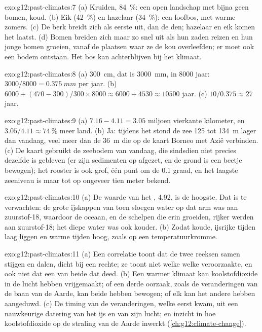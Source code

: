 \begin{solution}{exo:g12:past-climates:7}
(a) Kruiden, \qty{84}{\percent}: een open landschap met bijna geen bomen, koud.
(b) Eik (\qty{42}{\percent}) en hazelaar (\qty{34}{\percent}): een loofbos,
met warme zomers. (c) De berk breidt zich als eerste uit, dan de den; hazelaar en eik
komen het laatst. (d) Bomen breiden zich maar zo snel uit als hun zaden reizen en hun
jonge bomen groeien, vanaf de plaatsen waar ze de kou overleefden; er moet
ook een bodem ontstaan. Het bos kan achterblijven bij het klimaat.
\end{solution}

\begin{solution}{exo:g12:past-climates:8}
(a) \qty{300}{cm}, dat is \qty{3000}{mm}, in \num{8000} jaar: $3000/8000 =
\qty{0.375}{mm}$ per jaar. (b) $\num{6000} + (470 - 300)/300 \times \num{8000}
\approx \num{6000} + \num{4530} \approx \num{10500}$ jaar. (c) $10/0.375
\approx 27$ jaar.
\end{solution}

\begin{solution}{exo:g12:past-climates:9}
(a) $7.16 - 4.11 = 3.05$ miljoen vierkante kilometer, en $3.05/4.11 \approx
\qty{74}{\percent}$ meer land. (b) Ja: tijdens het  stond de zee
125 tot \qty{134}{m} lager dan vandaag, veel meer dan de \qty{36}{m}
die op de kaart Borneo met Azië verbinden. (c) De kaart gebruikt de zeebodem van vandaag, die sindsdien niet
precies dezelfde is gebleven (er zijn sedimenten op afgezet, en de
grond is een beetje bewogen); het rooster is ook grof, één punt om de 0.1
graad, en het laagste zeeniveau is maar tot op ongeveer tien meter bekend.
\end{solution}

\begin{solution}{exo:g12:past-climates:10}
(a) De waarde van het , \qty{4.92}{\permil}, is de
hoogste. Dat is te verwachten: de grote ijskappen van toen sloegen water op dat arm was
aan zuurstof-18, waardoor de oceaan, en de schelpen die erin groeiden, rijker werden aan
zuurstof-18; het diepe water was ook kouder. (b) Zodat koude, ijsrijke tijden
laag liggen en warme tijden hoog, zoals op een temperatuurkromme.
\end{solution}

\begin{solution}{exo:g12:past-climates:11}
(a) Een correlatie toont dat de twee reeksen samen stijgen en dalen, dicht
bij een rechte; ze toont niet welke welke veroorzaakte, en ook niet dat een van beide dat
deed. (b) Een warmer klimaat kan koolstofdioxide in de lucht hebben vrijgemaakt;
of een derde oorzaak, zoals de veranderingen van de baan van de Aarde, kan
beide hebben bewogen; of elk kan het andere hebben aangeduwd. (c) De timing van de veranderingen,
welke eerst kwam, uit een nauwkeurige datering van het ijs en van zijn lucht; en
inzicht in hoe koolstofdioxide op de straling van de Aarde inwerkt
(\cref{ch:g12:climate-change}).
\end{solution}

